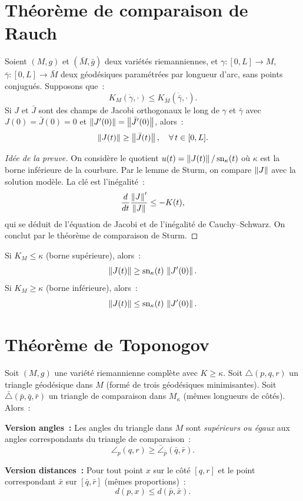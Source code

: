 \section{Th\'eor\`eme de comparaison de Rauch}

\begin{theoreme}[Rauch]
\label{thm:rauch}
Soient $(M, g)$ et $(\bar{M}, \bar{g})$ deux vari\'et\'es riemanniennes, et
$\gamma : [0, L] \to M$, $\bar\gamma : [0, L] \to \bar{M}$ deux g\'eod\'esiques
param\'etr\'ees par longueur d'arc, sans points conjugu\'es. Supposons que~:
\[
    K_M(\dot\gamma, \cdot) \leq K_{\bar{M}}(\dot{\bar\gamma}, \cdot).
\]
Si $J$ et $\bar{J}$ sont des champs de Jacobi orthogonaux le long de $\gamma$
et $\bar\gamma$ avec $J(0) = \bar{J}(0) = 0$ et $\left\| J'(0) \right\| = \left\| \bar{J}'(0) \right\|$,
alors~:
\[
    \left\| J(t) \right\| \geq \left\| \bar{J}(t) \right\|, \quad \forall\, t \in [0, L].
\]
\end{theoreme}

\begin{proof}[Id\'ee de la preuve]
On consid\`ere le quotient $u(t) = \left\| J(t) \right\|/\operatorname{sn}_\kappa(t)$
o\`u $\kappa$ est la borne inf\'erieure de la courbure. Par le lemme de Sturm,
on compare $\left\| J \right\|$ avec la solution mod\`ele. La cl\'e est l'in\'egalit\'e~:
\[
    \frac{d}{dt}\frac{\left\| J \right\|'}{\left\| J \right\|} \leq -K(t),
\]
qui se d\'eduit de l'\'equation de Jacobi et de l'in\'egalit\'e de Cauchy--Schwarz.
On conclut par le th\'eor\`eme de comparaison de Sturm.
\end{proof}

\begin{corollaire}
Si $K_M \leq \kappa$ (borne sup\'erieure), alors~:
\[
    \left\| J(t) \right\| \geq \operatorname{sn}_\kappa(t)\, \left\| J'(0) \right\|.
\]
Si $K_M \geq \kappa$ (borne inf\'erieure), alors~:
\[
    \left\| J(t) \right\| \leq \operatorname{sn}_\kappa(t)\, \left\| J'(0) \right\|.
\]
\end{corollaire}

\section{Th\'eor\`eme de Toponogov}

\begin{theoreme}
\label{thm:toponogov}
Soit $(M, g)$ une vari\'et\'e riemannienne compl\`ete avec $K \geq \kappa$. Soit
$\triangle(p, q, r)$ un triangle g\'eod\'esique dans $M$ (form\'e de trois g\'eod\'esiques
minimisantes). Soit $\bar\triangle(\bar{p}, \bar{q}, \bar{r})$ un triangle de
comparaison dans $M_\kappa$ (m\^emes longueurs de c\^ot\'es). Alors~:

\textbf{Version angles~:} Les angles du triangle dans $M$ sont \emph{sup\'erieurs
ou \'egaux} aux angles correspondants du triangle de comparaison~:
\[
    \angle_p(q, r) \geq \bar\angle_{\bar{p}}(\bar{q}, \bar{r}).
\]

\textbf{Version distances~:} Pour tout point $x$ sur le c\^ot\'e $[q, r]$ et le
point correspondant $\bar{x}$ sur $[\bar{q}, \bar{r}]$ (m\^emes proportions)~:
\[
    d(p, x) \leq d(\bar{p}, \bar{x}).
\]
\end{theoreme}


